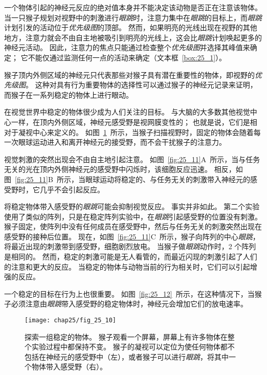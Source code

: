 一个物体引起的神经元反应的绝对值本身并不能决定该动物是否正在注意该物体。
当一只猴子规划对视野中的刺激进行\textit{眼跳}时，注意力集中在\textit{眼跳}的目标上，而\textit{眼跳}计划引发的活动位于\textit{优先级图}的顶部。
然而，如果明亮的光线出现在视野的其他地方，注意力就会不由自主地被吸引到明亮的光线上，这会比\textit{眼跳}计划唤起更多的神经元活动。
因此，注意力的焦点只能通过检查整个\textit{优先级图}并选择其峰值来确定；
它不能仅通过监测任何一点的活动来确定（文本框~\ref{box:25_1}）。


\begin{proposition} \label{box:25_1}
	
	\quad \quad 猴子顶内外侧区域的神经元只代表那些对猴子具有潜在重要性的物体，即视野的\textit{优先级图}。
	这种对具有行为重要物体的选择性可以通过猴子的神经元记录来证明，而猴子在一系列稳定的物体上进行眼动。
	
	\quad \quad 在视觉世界中稳定的物体很少成为人们关注的目标。
	与大脑的大多数其他视觉中心一样，在顶内外侧区域，神经元感受野是视网膜变性的；
	也就是说，它们是相对于凝视中心来定义的。
	如图~\ref{fig:25_10}~所示，当猴子扫描视野时，固定的物体会随着每一次眼球运动进入和离开神经元的接受野，而不会干扰猴子的注意力。
	
	\quad \quad 视觉刺激的突然出现会不由自主地引起注意。
	如图~\ref{fig:25_11}A~所示，当与任务无关的光在顶内外侧神经元的感受野中闪烁时，该细胞反应迅速。
	相反，如图~\ref{fig:25_11}B~所示，当眼球运动将稳定的、与任务无关的刺激带入神经元的感受野时，它几乎不会引起反应。
	
	\quad \quad 将稳定物体带入感受野的\textit{眼跳}可能会抑制视觉反应。
	事实并非如此。
	第二个实验使用了类似的阵列，只是在稳定阵列实验中，在\textit{眼跳}引起感受野的位置没有刺激。
	猴子固定，使阵列中没有任何成员在感受野中，然后与任务无关的刺激突然出现在感受野的接种后位置。
	现在，如图~\ref{fig:25_11}C~所示，猴子向阵列的中心\textit{眼跳}，将最近出现的刺激带到感受野，细胞剧烈放电。
	当猴子做\textit{眼跳}动作时，2 个阵列是相同的。
	然而，稳定的刺激可能是无人看管的，而最近闪现的刺激引起了人们的注意和更大的反应。
	当稳定的物体与动物当前的行为相关时，它们可以引起增强的反应。
	
	\quad \quad 一个稳定的目标在行为上也很重要。
	如图~\ref{fig:25_12}~所示，在这种情况下，当猴子必须注意由\textit{眼跳}带入感受野的稳定物体时，神经元会增加它们的放电速率。
	
\end{proposition}


\begin{figure}[htbp]
	\centering
	\texttt{[image: chap25/fig\_25\_10]}
	\caption{探索一组稳定的物体。
		猴子观看一个屏幕，屏幕上有许多物体在整个实验过程中都保持不变。
		猴子的凝视可以定位为使任何物体都不包括在神经元的感受野中（左），或者猴子可以进行\textit{眼跳}，将其中一个物体带入感受野（右）。}
	\label{fig:25_10}
\end{figure}



